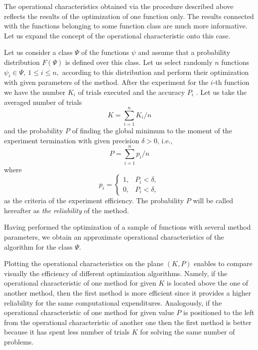 The operational characteristics obtained via the procedure described above reflects the results of the optimization of one function only. The results connected with the functions belonging to some function class are much more informative. Let us expand the concept of the operational characteristic onto this case.

Let us consider a class $\Psi$ of the functions $\psi$ and assume that a probability distribution $F(\Psi)$  is defined over this class. Let us select randomly $n$ functions $\psi_i\in\Psi,\:1\leq i\leq n,$  according to this distribution and perform their optimization with given parameters of the method. After the experiment for the $i$-th function we have the number $K_i$  of trials executed and the accuracy $P_i$ . Let us take the averaged number of trials 
\begin{displaymath}
K=\sum_{i=1}^n{K_i}/n
\end{displaymath}
and the probability $P$ of finding the global minimum to the moment of the experiment termination with given precision $\delta>0$, i.e.,
\begin{displaymath}
P=\sum_{i=1}^n{p_i}/n
\end{displaymath}
where
\begin{displaymath}
p_i =
  \begin{cases}
    1, & P_i<\delta, \\
    0, & P_i<\delta,
  \end{cases}
\end{displaymath}
as the criteria of the experiment efficiency. The probability $P$ will be called hereafter as \textit{the reliability} of the method.

Having performed the optimization of a sample of functions with several method parameters, we obtain an approximate operational characteristics of the algorithm  for the class $\Psi$.

Plotting the operational characteristics on the plane $(K,P)$   enables to compare visually the efficiency of different optimization algorithms. Namely, if the operational characteristic of one method for given $K$ is located above the one of another method, then the first method is more efficient since it provides a higher reliability for the same computational expenditures. Analogously, if the operational characteristic of one method for given value $P$ is positioned to the left from the operational characteristic of another one then the first method is better because it has spent less number of trials $K$ for solving the same number of problems. 

